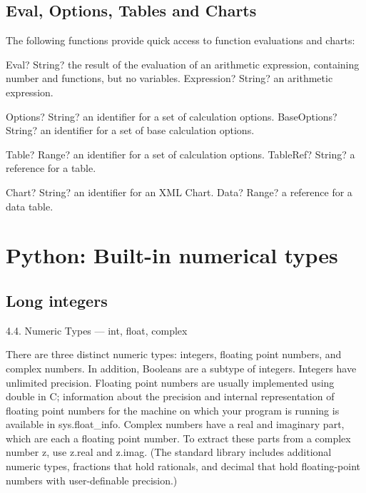 \newpage
\section{Eval, Options, Tables and Charts}

The following functions provide quick access to function evaluations and charts:

\vspace{0.3cm}
\begin{mpFunctionsExtract}
	\mpFunctionOne
	{Eval? String?  the result of the evaluation of an arithmetic expression, containing number and functions, but no variables.}
	{Expression? String? an arithmetic expression.}
\end{mpFunctionsExtract}


\vspace{0.3cm}
\begin{mpFunctionsExtract}
	\mpFunctionOne
	{Options? String?  an identifier for a set of calculation options.}
	{BaseOptions? String? an identifier for a set of base calculation options.}
\end{mpFunctionsExtract}


\vspace{0.3cm}
\begin{mpFunctionsExtract}
	\mpFunctionOne
	{Table? Range?  an identifier for a set of calculation options.}
	{TableRef? String? a reference for a table.}
\end{mpFunctionsExtract}


\vspace{0.3cm}
\begin{mpFunctionsExtract}
	\mpFunctionOne
	{Chart? String?  an identifier for an XML Chart.}
	{Data? Range? a reference for a data table.}
\end{mpFunctionsExtract}




\chapter{Python: Built-in numerical types}


\section{Long integers}

4.4. Numeric Types — int, float, complex

There are three distinct numeric types: integers, floating point numbers, and complex numbers. In addition, Booleans are a subtype of integers. Integers have unlimited precision. Floating point numbers are usually implemented using double in C; information about the precision and internal representation of floating point numbers for the machine on which your program is running is available in sys.float\_info. Complex numbers have a real and imaginary part, which are each a floating point number. To extract these parts from a complex number z, use z.real and z.imag. (The standard library includes additional numeric types, fractions that hold rationals, and decimal that hold floating-point numbers with user-definable precision.)

